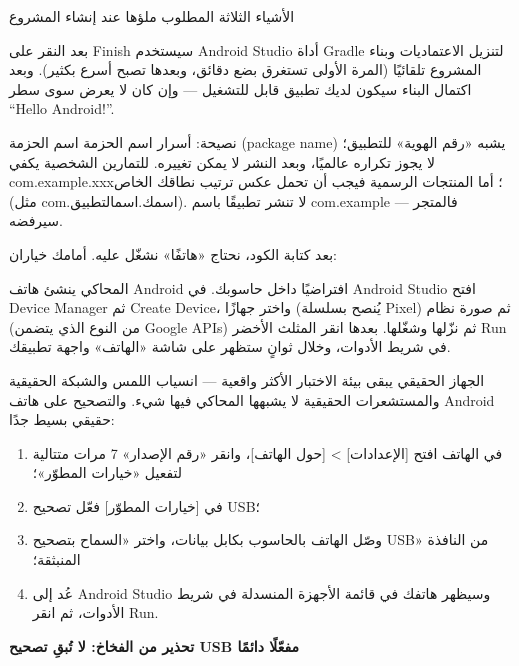\begin{center}\small\color{gray}الأشياء الثلاثة المطلوب ملؤها عند إنشاء المشروع\end{center}

بعد النقر على Finish سيستخدم Android Studio أداة Gradle لتنزيل الاعتماديات وبناء المشروع تلقائيًا (المرة الأولى تستغرق بضع دقائق، وبعدها تصبح أسرع بكثير). وبعد اكتمال البناء سيكون لديك تطبيق قابل للتشغيل — وإن كان لا يعرض سوى سطر “Hello Android!”.

\begin{tcbinfo}{نصيحة: أسرار اسم الحزمة}
اسم الحزمة (package name) يشبه «رقم الهوية» للتطبيق؛ لا يجوز تكراره عالميًا، وبعد النشر لا يمكن تغييره. للتمارين الشخصية يكفي com.example.xxx؛ أما المنتجات الرسمية فيجب أن تحمل عكس ترتيب نطاقك الخاص (مثل com.اسمك.اسمالتطبيق). لا تنشر تطبيقًا باسم com.example — فالمتجر سيرفضه.

\end{tcbinfo}


بعد كتابة الكود، نحتاج «هاتفًا» نشغّل عليه. أمامك خياران:


المحاكي ينشئ هاتف Android افتراضيًا داخل حاسوبك. في Android Studio افتح Device Manager ثم Create Device، واختر جهازًا (يُنصح بسلسلة Pixel) ثم صورة نظام (من النوع الذي يتضمن Google APIs) ثم نزّلها وشغّلها. بعدها انقر المثلث الأخضر Run في شريط الأدوات، وخلال ثوانٍ ستظهر على شاشة «الهاتف» واجهة تطبيقك.


الجهاز الحقيقي يبقى بيئة الاختبار الأكثر واقعية — انسياب اللمس والشبكة الحقيقية والمستشعرات الحقيقية لا يشبهها المحاكي فيها شيء. والتصحيح على هاتف Android حقيقي بسيط جدًا:

\begin{enumerate}
  \item في الهاتف افتح [الإعدادات] > [حول الهاتف]، وانقر «رقم الإصدار» 7 مرات متتالية لتفعيل «خيارات المطوّر»؛
  \item في [خيارات المطوّر] فعّل تصحيح USB؛
  \item وصّل الهاتف بالحاسوب بكابل بيانات، واختر «السماح بتصحيح USB» من النافذة المنبثقة؛
  \item عُد إلى Android Studio وسيظهر هاتفك في قائمة الأجهزة المنسدلة في شريط الأدوات، ثم انقر Run.
\end{enumerate}

\textbf{تحذير من الفخاخ: لا تُبقِ تصحيح USB مفعّلًا دائمًا}\par

